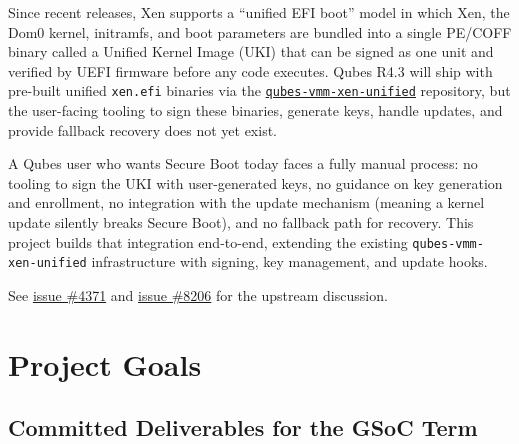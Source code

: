 \documentclass[12pt, a4paper]{article}
\begin{document}
Since recent releases, Xen supports a ``unified EFI boot'' model in which Xen, the Dom0 kernel, initramfs, and boot parameters are bundled into a single PE/COFF binary called a Unified Kernel Image (UKI) that can be signed as one unit and verified by UEFI firmware before any code executes. Qubes R4.3 will ship with pre-built unified \texttt{xen.efi} binaries via the \href{https://github.com/QubesOS/qubes-vmm-xen-unified}{\texttt{qubes-vmm-xen-unified}} repository, but the user-facing tooling to sign these binaries, generate keys, handle updates, and provide fallback recovery does not yet exist.

A Qubes user who wants Secure Boot today faces a fully manual process: no tooling to sign the UKI with user-generated keys, no guidance on key generation and enrollment, no integration with the update mechanism (meaning a kernel update silently breaks Secure Boot), and no fallback path for recovery. This project builds that integration end-to-end, extending the existing \texttt{qubes-vmm-xen-unified} infrastructure with signing, key management, and update hooks.

See \href{https://github.com/QubesOS/qubes-issues/issues/4371}{issue \#4371} and \href{https://github.com/QubesOS/qubes-issues/issues/8206}{issue \#8206} for the upstream discussion.

\section{Project Goals}

\subsection*{Committed Deliverables for the GSoC Term}
\end{document}
